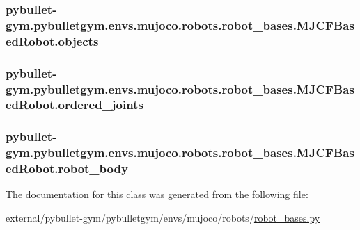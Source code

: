 \subsubsection[{\texorpdfstring{objects}{objects}}]{\setlength{\rightskip}{0pt plus 5cm}pybullet-\/gym.\+pybulletgym.\+envs.\+mujoco.\+robots.\+robot\+\_\+bases.\+M\+J\+C\+F\+Based\+Robot.\+objects}\hypertarget{classpybullet-gym_1_1pybulletgym_1_1envs_1_1mujoco_1_1robots_1_1robot__bases_1_1_m_j_c_f_based_robot_a8d7e99dabe7ef2836c10dabc968f97e2}{}\label{classpybullet-gym_1_1pybulletgym_1_1envs_1_1mujoco_1_1robots_1_1robot__bases_1_1_m_j_c_f_based_robot_a8d7e99dabe7ef2836c10dabc968f97e2}
\subsubsection[{\texorpdfstring{ordered\+\_\+joints}{ordered_joints}}]{\setlength{\rightskip}{0pt plus 5cm}pybullet-\/gym.\+pybulletgym.\+envs.\+mujoco.\+robots.\+robot\+\_\+bases.\+M\+J\+C\+F\+Based\+Robot.\+ordered\+\_\+joints}\hypertarget{classpybullet-gym_1_1pybulletgym_1_1envs_1_1mujoco_1_1robots_1_1robot__bases_1_1_m_j_c_f_based_robot_a2130d75d80159d888c3706079aa4265d}{}\label{classpybullet-gym_1_1pybulletgym_1_1envs_1_1mujoco_1_1robots_1_1robot__bases_1_1_m_j_c_f_based_robot_a2130d75d80159d888c3706079aa4265d}
\subsubsection[{\texorpdfstring{robot\+\_\+body}{robot_body}}]{\setlength{\rightskip}{0pt plus 5cm}pybullet-\/gym.\+pybulletgym.\+envs.\+mujoco.\+robots.\+robot\+\_\+bases.\+M\+J\+C\+F\+Based\+Robot.\+robot\+\_\+body}\hypertarget{classpybullet-gym_1_1pybulletgym_1_1envs_1_1mujoco_1_1robots_1_1robot__bases_1_1_m_j_c_f_based_robot_af24f69bc06e9b31164a3b985f7bc6383}{}\label{classpybullet-gym_1_1pybulletgym_1_1envs_1_1mujoco_1_1robots_1_1robot__bases_1_1_m_j_c_f_based_robot_af24f69bc06e9b31164a3b985f7bc6383}


The documentation for this class was generated from the following file\+:\begin{DoxyCompactItemize}
\item 
external/pybullet-\/gym/pybulletgym/envs/mujoco/robots/\hyperlink{mujoco_2robots_2robot__bases_8py}{robot\+\_\+bases.\+py}\end{DoxyCompactItemize}
